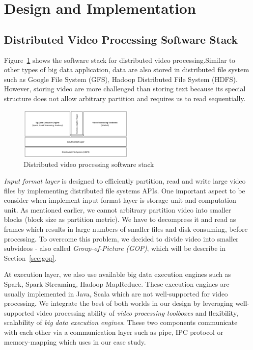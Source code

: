 \section{Design and Implementation}
\label{sec:sec_algorithm}

\subsection{Distributed Video Processing Software Stack}
Figure~\ref{fig:stack} shows the software stack for distributed video
processing.Similar to other types of big data application, data are also stored
in distributed file system such as Google File System (GFS)\cite{gfs}, Hadoop
Distributed File System (HDFS)\cite{hdfs}. However, storing video are more
challenged than storing text because its special structure does not allow
arbitrary partition and requires us to read sequentially.
\begin{figure}[htbp!]\centering
\vspace{-1ex}
\includegraphics[width=0.5\textwidth]{figures/softwarestack.pdf}
\vspace{-4ex}
\caption{Distributed video processing software stack}
\label{fig:stack}
\end{figure}
 \textit{Input format
layer} is designed to efficiently partition, read and write large video files by
implementing distributed file systems APIs. One important aspect to be consider
when implement input format layer is storage unit and computation unit. As
mentioned earlier, we cannot arbitrary partition video into smaller blocks
(block size as partition metric). We have to decompress it and read as frames
which results in large numbers of smaller files and disk-consuming, before
processing. To overcome this problem, we decided to divide video into smaller
subvideos - also called \textit{Group-of-Picture (GOP)}, which will be describe
in Section~\ref{sec:gop}. 

At execution layer, we also use available big data execution engines such as
Spark\cite{spark}, Spark Streaming\cite{sparkstreaming}, Hadoop
MapReduce\cite{hadoop}. These execution engines are usually implemented in Java,
Scala which are not well-supported for video processing. We integrate the best
of both worlds in our design by leveraging well-supported video processing
ability of \textit{video processing toolboxes} and flexibility, scalability of
\textit{big data execution engines}. These two components communicate with each
other via a communication layer such as pipe, IPC protocol or memory-mapping which uses in our case study.

